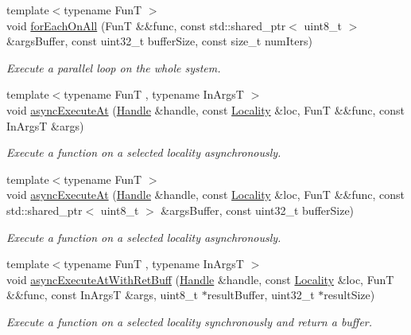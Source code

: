 \begin{DoxyCompactItemize}
{\footnotesize template$<$typename Fun\-T $>$ }\\void \hyperlink{namespaceshad_1_1rt_a3642b67c7ddc6f9d527616e4eb6cdbde}{for\-Each\-On\-All} (Fun\-T \&\&func, const std\-::shared\-\_\-ptr$<$ uint8\-\_\-t $>$ \&args\-Buffer, const uint32\-\_\-t buffer\-Size, const size\-\_\-t num\-Iters)
\begin{DoxyCompactList}\small\item\em Execute a parallel loop on the whole system. \end{DoxyCompactList}\item 
{\footnotesize template$<$typename Fun\-T , typename In\-Args\-T $>$ }\\void \hyperlink{namespaceshad_1_1rt_aad88d972c54520fa6da6661c0972ca66}{async\-Execute\-At} (\hyperlink{classshad_1_1rt_1_1Handle}{Handle} \&handle, const \hyperlink{classshad_1_1rt_1_1Locality}{Locality} \&loc, Fun\-T \&\&func, const In\-Args\-T \&args)
\begin{DoxyCompactList}\small\item\em Execute a function on a selected locality asynchronously. \end{DoxyCompactList}\item 
{\footnotesize template$<$typename Fun\-T $>$ }\\void \hyperlink{namespaceshad_1_1rt_a8690d0c19d1d2e7acce51b9c83223c94}{async\-Execute\-At} (\hyperlink{classshad_1_1rt_1_1Handle}{Handle} \&handle, const \hyperlink{classshad_1_1rt_1_1Locality}{Locality} \&loc, Fun\-T \&\&func, const std\-::shared\-\_\-ptr$<$ uint8\-\_\-t $>$ \&args\-Buffer, const uint32\-\_\-t buffer\-Size)
\begin{DoxyCompactList}\small\item\em Execute a function on a selected locality asynchronously. \end{DoxyCompactList}\item 
{\footnotesize template$<$typename Fun\-T , typename In\-Args\-T $>$ }\\void \hyperlink{namespaceshad_1_1rt_a7021749e6a86c90e762645385e22ac5c}{async\-Execute\-At\-With\-Ret\-Buff} (\hyperlink{classshad_1_1rt_1_1Handle}{Handle} \&handle, const \hyperlink{classshad_1_1rt_1_1Locality}{Locality} \&loc, Fun\-T \&\&func, const In\-Args\-T \&args, uint8\-\_\-t $\ast$result\-Buffer, uint32\-\_\-t $\ast$result\-Size)
\begin{DoxyCompactList}\small\item\em Execute a function on a selected locality synchronously and return a buffer. \end{DoxyCompactList}\item 

\end{DoxyCompactItemize}
